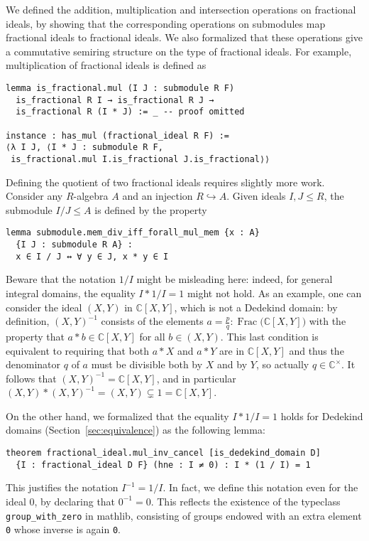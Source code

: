 \documentclass[sn-mathphys]{sn-jnl}%
\renewcommand{\C}{\mathbb{C}}
\newcommand{\lean}[1]{\texttt{#1}\xspace}
\newcommand{\mathlib}{\textsf{mathlib}\xspace}
\DeclareMathOperator{\Frac}{Frac}
\begin{document}
We defined the addition, multiplication and intersection operations on fractional ideals,
by showing that the corresponding operations on submodules map fractional ideals to fractional ideals.
We also formalized that these operations give a commutative semiring structure on the type of fractional ideals.
For example, multiplication of fractional ideals is defined as
\begin{lstlisting}
lemma is_fractional.mul (I J : submodule R F)
  is_fractional R I → is_fractional R J →
  is_fractional R (I * J) := _ -- proof omitted

instance : has_mul (fractional_ideal R F) :=
⟨λ I J, ⟨I * J : submodule R F,
 is_fractional.mul I.is_fractional J.is_fractional⟩⟩
\end{lstlisting}

Defining the quotient of two fractional ideals requires slightly more work. Consider any $R$-algebra $A$ and an injection $R\hookrightarrow A$. Given ideals $I,J\le R$, the submodule $I / J\le A$
is defined by the property
\pagebreak[3] %
\begin{lstlisting}
lemma submodule.mem_div_iff_forall_mul_mem {x : A}
  {I J : submodule R A} :
  x ∈ I / J ↔ ∀ y ∈ J, x * y ∈ I
\end{lstlisting}
Beware that the notation $1/I$ might be misleading here: indeed, for general integral domains, the equality $I\ast 1/I=1$ might not hold. As an example, one can consider the ideal $(X,Y)$ in $\C[X,Y]$, which is not a Dedekind domain: by definition, $(X, Y)^{-1}$ consists of the elements $a=\frac{p}{q} \colon \Frac \bigl(\C[X,Y]\bigr)$ with the property that $a \ast b \in \C[X,Y]$ for all $b \in (X,Y)$. This last condition is equivalent to requiring that both $a \ast X$ and $a \ast Y$ are in $\C[X,Y]$ and thus the denominator $q$ of $a$ must be divisible both by $X$ and by $Y$, so actually $q\in\C^\times$. It follows that $(X,Y)^{-1}=\C[X,Y]$, and in particular $(X,Y)\ast (X,Y)^{-1}=(X,Y)\subsetneq 1=\C[X,Y]$.

On the other hand, we formalized that the equality $I\ast 1/I=1$ holds for Dedekind domains (Section~\ref{sec:equivalence}) as the following lemma:
\begin{lstlisting}
theorem fractional_ideal.mul_inv_cancel [is_dedekind_domain D]
  {I : fractional_ideal D F} (hne : I ≠ 0) : I * (1 / I) = 1
\end{lstlisting}
This justifies the notation $I^{-1}=1/I$. In fact, we define this notation even for the ideal $0$, by declaring that $0^{-1}=0$. This reflects the existence of the typeclass \lean{group\_with\_zero} in \mathlib, consisting of groups endowed with an extra element \lean{0} whose inverse is again \lean{0}.
\end{document}
